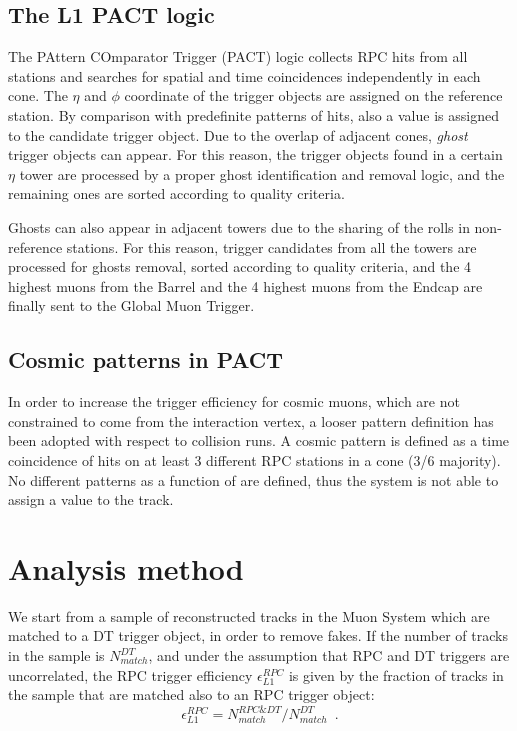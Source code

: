\subsection{The L1 PACT logic}
The PAttern COmparator Trigger (PACT) logic 
collects RPC hits from all stations and searches for
spatial and time coincidences independently
in each cone. The $\eta$ and $\phi$ coordinate of the trigger
objects are assigned on the reference station.
By comparison with predefinite patterns of hits, 
also a \pt value is assigned to the candidate trigger 
object. Due to the overlap of adjacent cones, 
{\em ghost} trigger objects can appear. For this reason, 
the trigger objects found in a certain $\eta$ tower 
are processed by a proper ghost identification and removal logic,
and the remaining ones are sorted according to quality criteria.

Ghosts can also appear in adjacent towers due to the 
sharing of the rolls in non-reference stations.
For this reason, trigger candidates from all the towers are 
processed for ghosts removal, sorted according to 
quality criteria, and the 4 highest \pt muons
from the Barrel and the 4 highest \pt muons from the 
Endcap are finally sent to the Global Muon Trigger.

\subsection{Cosmic patterns in PACT}
In order to increase the trigger efficiency for 
cosmic muons, which are not constrained
to come from the interaction vertex, 
a looser pattern definition has been 
adopted with respect to collision runs.
A cosmic pattern is defined as a 
time coincidence of hits on at least
3 different RPC stations in a cone (3/6 majority).
No different patterns as a function 
of \pt are defined, thus the system is
not able to assign a \pt value 
to the track.

\section{Analysis method}
We start from a sample of reconstructed tracks 
in the Muon System which are matched to a DT 
trigger object, in order to remove fakes. If 
the number of tracks in the sample is
$N_{match}^{DT}$, and under the assumption
that RPC and DT triggers are uncorrelated,
the RPC trigger efficiency 
$\epsilon_{L1}^{RPC}$ is given by the fraction 
of tracks in the sample that are matched also 
to an RPC trigger object:
\begin{equation}
\epsilon_{L1}^{RPC} = N_{match}^{RPC\&DT}/N_{match}^{DT} \,\,\,.
\end{equation}


